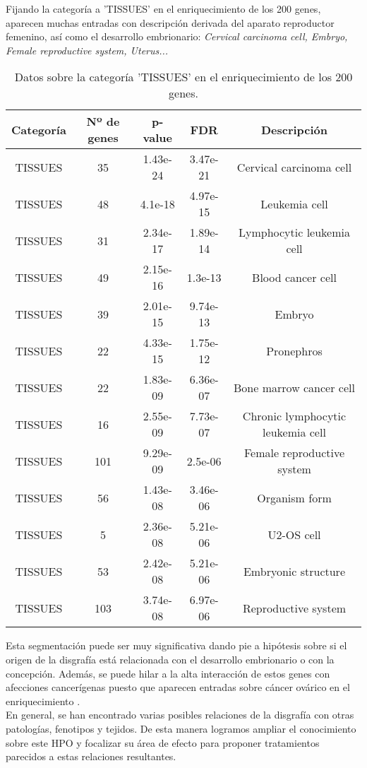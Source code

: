 Fijando la categoría a 'TISSUES' en el enriquecimiento de los 200 genes, aparecen muchas entradas con descripción derivada del aparato reproductor femenino, así como el desarrollo embrionario: \textit{ Cervical carcinoma cell, Embryo, Female reproductive system, Uterus... }

\begin{table}[h]
	\centering
	\caption{Datos sobre la categoría 'TISSUES' en el enriquecimiento de los 200 genes.}
	\label{tab:datos-tissues}
	\begin{tabular}{|c|c|c|c|c|}
		\hline
		\textbf{Categoría} & \textbf{Nº de genes} & \textbf{p-value} & \textbf{FDR} & \textbf{Descripción} \\
		\hline
		TISSUES & 35 & 1.43e-24 & 3.47e-21 & Cervical carcinoma cell \\
		TISSUES & 48 & 4.1e-18 & 4.97e-15 & Leukemia cell \\
		TISSUES & 31 & 2.34e-17 & 1.89e-14 & Lymphocytic leukemia cell \\
		TISSUES & 49 & 2.15e-16 & 1.3e-13 & Blood cancer cell \\
		TISSUES & 39 & 2.01e-15 & 9.74e-13 & Embryo \\
		TISSUES & 22 & 4.33e-15 & 1.75e-12 & Pronephros \\
		TISSUES & 22 & 1.83e-09 & 6.36e-07 & Bone marrow cancer cell \\
		TISSUES & 16 & 2.55e-09 & 7.73e-07 & Chronic lymphocytic leukemia cell \\
		TISSUES & 101 & 9.29e-09 & 2.5e-06 & Female reproductive system \\
		TISSUES & 56 & 1.43e-08 & 3.46e-06 & Organism form \\
		TISSUES & 5 & 2.36e-08 & 5.21e-06 & U2-OS cell \\
		TISSUES & 53 & 2.42e-08 & 5.21e-06 & Embryonic structure \\
		TISSUES & 103 & 3.74e-08 & 6.97e-06 & Reproductive system \\
		\hline
	\end{tabular}
	
\end{table}

Esta segmentación puede ser muy significativa dando pie a hipótesis sobre si el origen de la disgrafía está relacionada con el desarrollo embrionario o con la concepción. Además, se puede hilar a la alta interacción de estos genes con afecciones cancerígenas puesto que aparecen entradas sobre cáncer ovárico en el enriquecimiento \cite{Mad2014}.\\

En general, se han encontrado varias posibles relaciones de la disgrafía con otras patologías, fenotipos y tejidos. De esta manera logramos ampliar el conocimiento sobre este HPO y focalizar su área de efecto para proponer tratamientos parecidos a estas relaciones resultantes.

